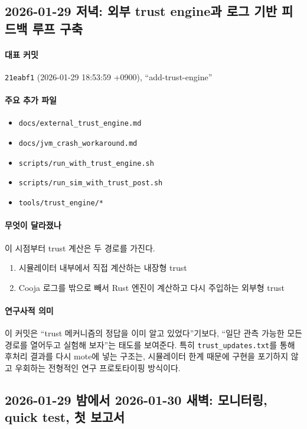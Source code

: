 \documentclass[12pt,a4paper]{article}
\begin{document}
\subsection{2026-01-29 저녁: 외부 trust engine과 로그 기반 피드백 루프 구축}

\paragraph{대표 커밋}
\texttt{21eabf1} (2026-01-29 18:53:59 +0900), ``add-trust-engine''

\paragraph{주요 추가 파일}
\begin{itemize}[leftmargin=1.5em]
\item \texttt{docs/external\_trust\_engine.md}
\item \texttt{docs/jvm\_crash\_workaround.md}
\item \texttt{scripts/run\_with\_trust\_engine.sh}
\item \texttt{scripts/run\_sim\_with\_trust\_post.sh}
\item \texttt{tools/trust\_engine/*}
\end{itemize}

\paragraph{무엇이 달라졌나}
이 시점부터 trust 계산은 두 경로를 가진다.

\begin{enumerate}[leftmargin=1.5em]
\item 시뮬레이터 내부에서 직접 계산하는 내장형 trust
\item Cooja 로그를 밖으로 빼서 Rust 엔진이 계산하고 다시 주입하는 외부형 trust
\end{enumerate}

\paragraph{연구사적 의미}
이 커밋은 ``trust 메커니즘의 정답을 이미 알고 있었다''기보다,
``일단 관측 가능한 모든 경로를 열어두고 실험해 보자''는 태도를 보여준다.
특히 \texttt{trust\_updates.txt}를 통해 후처리 결과를 다시 mote에 넣는 구조는,
시뮬레이터 한계 때문에 구현을 포기하지 않고 우회하는 전형적인 연구 프로토타이핑 방식이다.

\subsection{2026-01-29 밤에서 2026-01-30 새벽: 모니터링, quick test, 첫 보고서}
\end{document}
